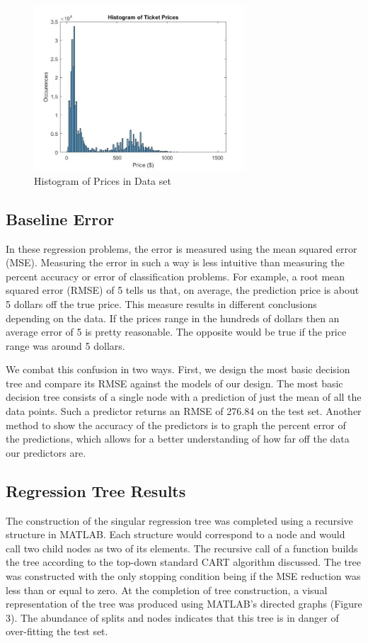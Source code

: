 \documentclass{article}
\begin{document}
\begin{figure}[ht]
\caption{Histogram of Prices in Data set}
\centering
\includegraphics[width=0.7\textwidth]{Fig2}
\end{figure}

\subsection{Baseline Error}

In these regression problems, the error is measured using the mean squared error (MSE). Measuring the error in such a way is less intuitive than measuring the percent accuracy or error of classification problems. For example, a root mean squared error (RMSE) of 5 tells us that, on average, the prediction price is about 5 dollars off the true price. This measure results in different conclusions depending on the data. If the prices range in the hundreds of dollars then an average error of 5 is pretty reasonable. The opposite would be true if the price range was around 5 dollars.

We combat this confusion in two ways. First, we design the most basic decision tree and compare its RMSE against the models of our design. The most basic decision tree consists of a single node with a prediction of just the mean of all the data points. Such a predictor returns an RMSE of 276.84 on the test set. Another method to show the accuracy of the predictors is to graph the percent error of the predictions, which allows for a better understanding of how far off the data our predictors are.

\subsection{Regression Tree Results}

The construction of the singular regression tree was completed using a recursive structure in MATLAB. Each structure would correspond to a node and would call two child nodes as two of its elements. The recursive call of a function builds the tree according to the top-down standard CART algorithm discussed. The tree was constructed with the only stopping condition being if the MSE reduction was less than or equal to zero. At the completion of tree construction, a visual representation of the tree was produced using MATLAB's directed graphs (Figure 3). The abundance of splits and nodes indicates that this tree is in danger of over-fitting the test set.
\end{document}
